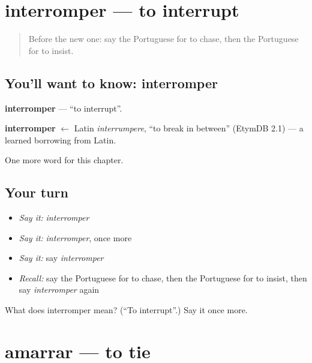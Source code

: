 \section[interromper]{interromper — to interrupt}

\label{lesson:PT-C145-interromper}



\begin{quote}
Before the new one: say the Portuguese for to chase, then the Portuguese for to insist.
\end{quote}

\subsection*{You'll want to know: interromper}
\textbf{interromper} — \textquotedblleft{}to interrupt\textquotedblright{}.

\begin{cousinweb}
\textbf{interromper} $\leftarrow$ Latin \emph{interrumpere}, \textquotedblleft{}to break in between\textquotedblright{} (EtymDB 2.1) — a learned borrowing from Latin.
\end{cousinweb}

\begin{grammarlens}[title={What you've built}]
One more word for this chapter.
\end{grammarlens}

\subsection*{Your turn}
\begin{itemize}
\raggedright
  \item \emph{Say it:} \emph{interromper}
  \item \emph{Say it:} \emph{interromper}, once more
  \item \emph{Say it:} say \emph{interromper}
  \item \emph{Recall:} say the Portuguese for to chase, then the Portuguese for to insist, then say \emph{interromper} again
\end{itemize}

\begin{tcolorbox}[breakable,colback=teal!4,colframe=teal!35!black,title={Before you move on}]
What does interromper mean? (\textquotedblleft{}To interrupt\textquotedblright{}.) Say it once more.
\end{tcolorbox}
\section[amarrar]{amarrar — to tie}

